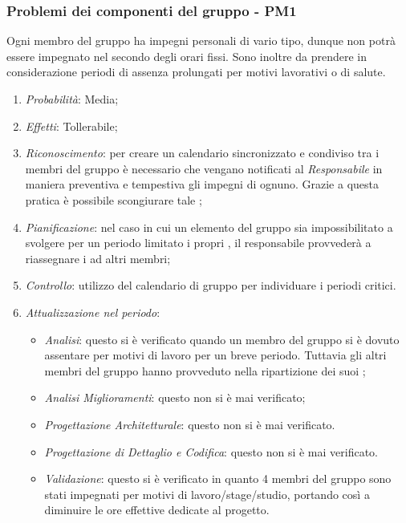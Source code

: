 \subsubsection{Problemi dei componenti del gruppo - PM1}
Ogni membro del gruppo ha impegni personali di vario tipo, dunque non potr\`a essere impegnato nel  secondo degli orari fissi. Sono inoltre da prendere in considerazione periodi di assenza prolungati per motivi lavorativi o di salute.
\begin{enumerate}
\item \textit{Probabilit\`a}: Media;
\item \textit{Effetti}: Tollerabile;
\item \textit{Riconoscimento}: per creare un calendario sincronizzato e condiviso tra i membri del gruppo è necessario che vengano notificati al \textit{Responsabile} in maniera preventiva e tempestiva gli impegni di ognuno. Grazie a questa pratica è possibile scongiurare tale ;
\item \textit{Pianificazione}: nel caso in cui un elemento del gruppo sia impossibilitato a svolgere per un periodo limitato i propri , il responsabile provveder\`a a riassegnare i  ad altri membri;
\item \textit{Controllo}: utilizzo del calendario di gruppo per individuare i periodi critici.
\item \textit{Attualizzazione nel periodo}: 
	\begin{itemize}
	\item \textit{Analisi}: questo  si è verificato quando un membro del gruppo si è dovuto assentare per motivi di lavoro per un breve periodo. Tuttavia gli altri membri del gruppo hanno provveduto nella ripartizione dei suoi ;
	\item \textit{Analisi Miglioramenti}: questo  non si è mai verificato;
	\item \textit{Progettazione Architetturale}: questo  non si è mai verificato.
	\item \textit{Progettazione di Dettaglio e Codifica}: questo  non si è mai verificato.
	\item \textit{Validazione}: questo  si \`e verificato in quanto 4 membri del gruppo sono stati impegnati per motivi di lavoro/stage/studio, portando così a diminuire le ore effettive dedicate al progetto.
	\end{itemize}
\end{enumerate}


